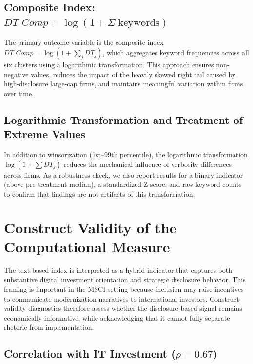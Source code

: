 \subsection{\texorpdfstring{Composite Index: $DT\_Comp = \log(1 + \Sigma\;\mathrm{keywords})$}{Composite Index: DT\_Comp = log(1 + sum keywords)}}

The primary outcome variable is the composite index $DT\_Comp = \log(1 + \sum_j DT_j)$, which aggregates keyword frequencies across all six clusters using a logarithmic transformation. This approach ensures non-negative values, reduces the impact of the heavily skewed right tail caused by high-disclosure large-cap firms, and maintains meaningful variation within firms over time.

\subsection{Logarithmic Transformation and Treatment of Extreme Values}

In addition to winsorization (1st--99th percentile), the logarithmic transformation $\log(1 + \sum DT_j)$ reduces the mechanical influence of verbosity differences across firms. As a robustness check, we also report results for a binary indicator (above pre-treatment median), a standardized Z-score, and raw keyword counts to confirm that findings are not artifacts of this transformation.

\section{Construct Validity of the Computational Measure}

The text-based index is interpreted as a hybrid indicator that captures both substantive digital investment orientation and strategic disclosure behavior. This framing is important in the MSCI setting because inclusion may raise incentives to communicate modernization narratives to international investors. Construct-validity diagnostics therefore assess whether the disclosure-based signal remains economically informative, while acknowledging that it cannot fully separate rhetoric from implementation.

\subsection{\texorpdfstring{Correlation with IT Investment ($\rho = 0.67$)}{Correlation with IT Investment (rho = 0.67)}}

